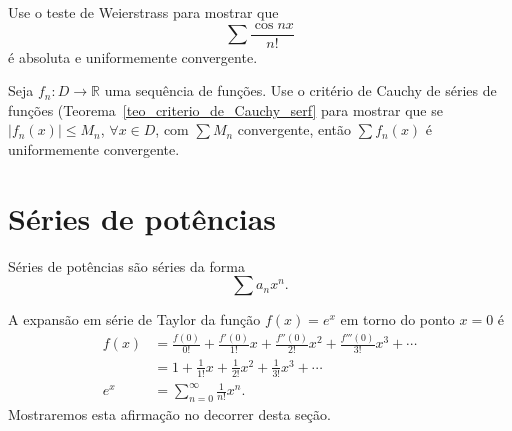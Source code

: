 \begin{exer}
  Use o teste de Weierstrass para mostrar que
  \begin{equation}
    \sum \frac{\cos nx}{n!}
  \end{equation}
é absoluta e uniformemente convergente.
\end{exer}

\begin{exer}
  Seja $f_n:D\to\mathbb{R}$ uma sequência de funções. Use o critério de Cauchy de séries de funções (Teorema~\ref{teo_criterio_de_Cauchy_serf} para mostrar que se $|f_n(x)|\leq M_n$, $\forall x\in D$, com $\sum M_n$ convergente, então $\sum f_n(x)$ é uniformemente convergente.
\end{exer}

\section{Séries de potências}\label{cap_ssfuncoes_ser_pot}

Séries de potências são séries da forma
\begin{equation}
  \sum a_nx^n.
\end{equation}

\begin{ex}
  A expansão em série de Taylor da função $f(x)=e^x$ em torno do ponto $x=0$ é
  \begin{align}
    f(x) &= \frac{f(0)}{0!} + \frac{f'(0)}{1!}x + \frac{f''(0)}{2!}x^2 + \frac{f'''(0)}{3!}x^3 + \cdots\\
    &= 1 + \frac{1}{1!}x + \frac{1}{2!}x^2 + \frac{1}{3!}x^3 + \cdots\\
    e^{x} &= \sum_{n=0}^\infty \frac{1}{n!}x^n.
  \end{align}
Mostraremos esta afirmação no decorrer desta seção.
\end{ex}

